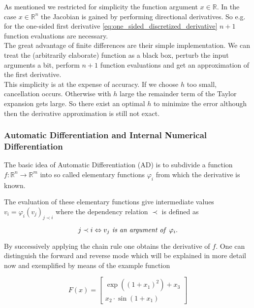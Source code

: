 \documentclass{scrartcl}[12pt, halfparskip]
\numberwithin{equation}{section}
\numberwithin{figure}{section}
\numberwithin{table}{section}
\begin{document}
As mentioned we restricted for simplicity the function argument $x \in \mathbb{R}$. In the case $x \in \mathbb{R}^n$ the Jacobian is gained by performing directional derivatives. So e.g. for the one-sided first derivative \cref{eq:one_sided_discretized_derivative} $n+1$ function evaluations are necessary. \\

The great advantage of finite differences are their simple implementation. We can treat the (arbitrarily elaborate) function as a black box, perturb the input arguments a bit, perform $n+1$ function evaluations and get an approximation of the first derivative. \\
This simplicity is at the expense of accuracy. If we choose $h$ too small, cancellation occurs. Otherwise with $h$ large the remainder term of the Taylor expansion gets large. So there exist an optimal $h$ to minimize the error although then the derivative approximation is still not exact.




\subsubsection{Automatic Differentiation and Internal Numerical Differentiation}
The basic idea of Automatic Differentiation (AD) is to subdivide a function ${f: \mathbb{R}^n \rightarrow \mathbb{R}^m}$ into so called elementary functions $\varphi_i$ from which the derivative is known. 

The evaluation of these elementary functions give intermediate values $v_i = \varphi_i(v_j)_{j \prec i}$ where the dependency relation $\prec$ is defined as

\begin{equation}
j \prec i \Leftrightarrow v_j \text{\textit{ is an argument of }} \varphi_i.
\end{equation}

By successively applying the chain rule one obtains the derivative of $f$.
One can distinguish the forward and reverse mode which will be explained in more detail now and exemplified by means of the example function

\begin{equation}
F(x) = 
\begin{bmatrix}
\exp((1+x_1)^2) + x_3 \\
x_2 \cdot \sin(1+x_1)
\end{bmatrix}
\label{eq:AD_example}
\end{equation}
\end{document}
